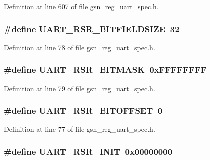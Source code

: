 Definition at line 607 of file gsn\_\-reg\_\-uart\_\-spec.h.

\hypertarget{a00575_a456ae18a3f4e54606a1c773942e00cb6}{
\subsubsection[{UART\_\-RSR\_\-BITFIELDSIZE}]{\setlength{\rightskip}{0pt plus 5cm}\#define UART\_\-RSR\_\-BITFIELDSIZE~32}}
\label{a00575_a456ae18a3f4e54606a1c773942e00cb6}


Definition at line 78 of file gsn\_\-reg\_\-uart\_\-spec.h.

\hypertarget{a00575_afb215d0e887ea40d821f59828ed8511b}{
\subsubsection[{UART\_\-RSR\_\-BITMASK}]{\setlength{\rightskip}{0pt plus 5cm}\#define UART\_\-RSR\_\-BITMASK~0xFFFFFFFF}}
\label{a00575_afb215d0e887ea40d821f59828ed8511b}


Definition at line 79 of file gsn\_\-reg\_\-uart\_\-spec.h.

\hypertarget{a00575_a5fc882f3464f0f83b83b0d7c2a135f39}{
\subsubsection[{UART\_\-RSR\_\-BITOFFSET}]{\setlength{\rightskip}{0pt plus 5cm}\#define UART\_\-RSR\_\-BITOFFSET~0}}
\label{a00575_a5fc882f3464f0f83b83b0d7c2a135f39}


Definition at line 77 of file gsn\_\-reg\_\-uart\_\-spec.h.

\hypertarget{a00575_acf45f450b1293ca140a7bc7b3972324c}{
\subsubsection[{UART\_\-RSR\_\-INIT}]{\setlength{\rightskip}{0pt plus 5cm}\#define UART\_\-RSR\_\-INIT~0x00000000}}
\label{a00575_acf45f450b1293ca140a7bc7b3972324c}


